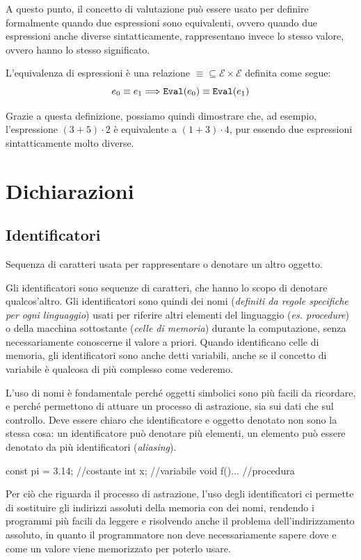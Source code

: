 \documentclass[oneside,a4paper,11pt]{book}
\theoremstyle{italicstyle}
\theoremstyle{normStyle}
\begin{document}
A questo punto, il concetto di valutazione può essere usato per definire formalmente quando due espressioni 
sono equivalenti, ovvero quando due espressioni anche diverse sintatticamente, 
rappresentano invece lo stesso valore, ovvero hanno lo stesso significato.
\begin{tcolorbox}[title = {Equivalenza di espressioni}]
  L'equivalenza di espressioni è una relazione $\equiv \subseteq \mathcal{E} \times \mathcal{E}$
  definita come segue:
  \[
    e_0 \equiv e_1 \Longrightarrow \verb|Eval|(e_0)\equiv\verb|Eval|(e_1)
  \]
\end{tcolorbox}
Grazie a questa definizione, possiamo quindi dimostrare che, ad esempio, l'espressione $(3+5)\cdot 2$ è 
equivalente a $(1+3)\cdot 4$, pur essendo due espressioni sintatticamente molto diverse.

\chapter{Dichiarazioni}
\section{Identificatori}
\begin{tcolorbox}[title = {Identificatori}]
  Sequenza di caratteri usata per rappresentare o denotare un altro oggetto.
\end{tcolorbox}
Gli identificatori sono sequenze di caratteri, che hanno lo scopo 
di denotare qualcos'altro. Gli identificatori sono quindi dei nomi (\textit{definiti 
da regole specifiche per ogni linguaggio}) usati per riferire altri elementi del linguaggio
(\textit{es. procedure}) 
o della macchina sottostante (\textit{celle di memoria}) durante la computazione, 
senza necessariamente conoscerne il valore a priori. Quando identificano celle di memoria, 
gli identificatori sono anche detti variabili, anche se il concetto di variabile è 
qualcosa di più complesso come vederemo.

L'uso di nomi è fondamentale perché oggetti simbolici sono più facili da ricordare, e 
perché permettono di attuare un processo di astrazione, sia sui dati che sul controllo.
Deve essere chiaro che identificatore e oggetto denotato non sono la stessa cosa: un 
identificatore può denotare più elementi, un elemento può 
essere denotato da più identificatori (\textit{aliasing}).
\begin{algorithm}
  const pi = 3.14;  //costante
  int x;            //variabile
  void f(){...}     //procedura
\end{algorithm}
Per ciò che riguarda il processo di astrazione, l'uso degli identificatori 
ci permette di sostituire gli indirizzi assoluti della memoria con dei nomi, 
rendendo i programmi più facili da leggere e risolvendo anche il problema 
dell'indirizzamento assoluto, in quanto il programmatore 
non deve necessariamente sapere dove e come un valore viene memorizzato 
per poterlo usare.
\end{document}
